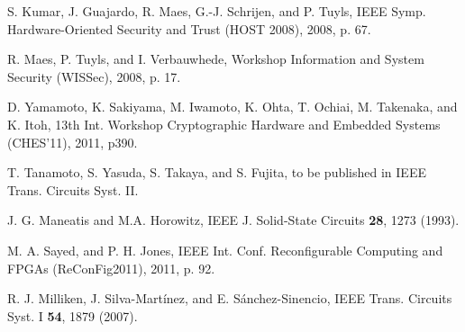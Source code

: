 \documentclass[%
reprint, amsmath,amssymb,%
pra,
]{revtex4-1}
\begin{document}
\begin{thebibliography}{99}
S. Kumar, J. Guajardo, R. Maes, G.-J. Schrijen, and P. Tuyls, 
IEEE Symp. Hardware-Oriented Security and Trust (HOST 2008), 2008, p. 67.

R. Maes, P. Tuyls, and I. Verbauwhede, 
Workshop Information and System Security (WISSec), 2008, p. 17. 

D. Yamamoto, K. Sakiyama, M. Iwamoto, K. Ohta, T. Ochiai, M. Takenaka, and K. Itoh, 
13th Int. Workshop Cryptographic Hardware and Embedded Systems (CHES'11), 2011, p390.




T. Tanamoto, S. Yasuda, S. Takaya, and S. Fujita,
to be published in IEEE Trans. Circuits Syst. II.

J. G. Maneatis and M.A. Horowitz,
IEEE J. Solid-State Circuits {\bf 28}, 1273 (1993).

M. A. Sayed, and P. H. Jones, 
IEEE Int. Conf. Reconfigurable Computing and FPGAs (ReConFig2011), 2011, p. 92.

R. J. Milliken, J. Silva-Martínez, and E. Sánchez-Sinencio, 
IEEE Trans. Circuits Syst. I {\bf 54}, 1879 (2007). 


\end{thebibliography}
\end{document}
